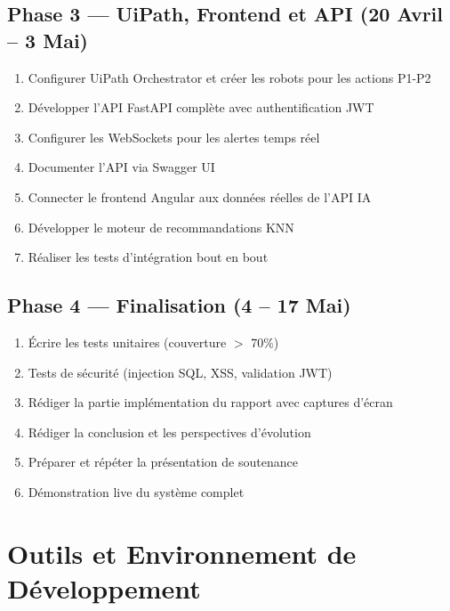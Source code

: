 \documentclass[12pt,a4paper]{report}
\begin{document}
\subsection{Phase 3 --- UiPath, Frontend et API (20 Avril -- 3 Mai)}

\begin{enumerate}[noitemsep, start=23]
    \item Configurer UiPath Orchestrator et créer les robots pour les actions P1-P2
    \item Développer l'API FastAPI complète avec authentification JWT
    \item Configurer les WebSockets pour les alertes temps réel
    \item Documenter l'API via Swagger UI
    \item Connecter le frontend Angular aux données réelles de l'API IA
    \item Développer le moteur de recommandations KNN
    \item Réaliser les tests d'intégration bout en bout
\end{enumerate}

\subsection{Phase 4 --- Finalisation (4 -- 17 Mai)}

\begin{enumerate}[noitemsep, start=30]
    \item Écrire les tests unitaires (couverture $>$ 70\%)
    \item Tests de sécurité (injection SQL, XSS, validation JWT)
    \item Rédiger la partie implémentation du rapport avec captures d'écran
    \item Rédiger la conclusion et les perspectives d'évolution
    \item Préparer et répéter la présentation de soutenance
    \item Démonstration live du système complet
\end{enumerate}

\section{Outils et Environnement de Développement}
\end{document}
